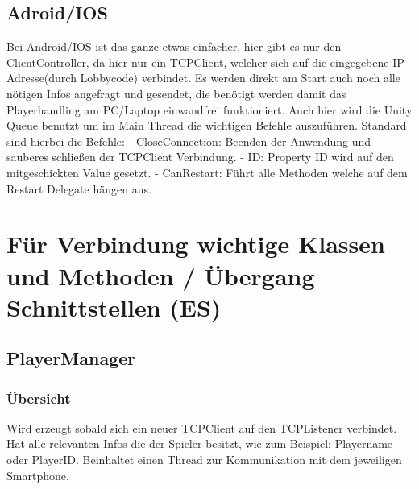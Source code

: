 \subsection{Adroid/IOS}
Bei Android/IOS ist das ganze etwas einfacher, hier gibt es nur den ClientController, da hier nur ein TCPClient, welcher sich auf die eingegebene IP-Adresse(durch Lobbycode) verbindet. Es werden direkt am Start auch noch alle nötigen Infos angefragt und gesendet, die benötigt werden damit das Playerhandling am PC/Laptop einwandfrei funktioniert. Auch hier wird die Unity Queue benutzt um im Main Thread die wichtigen Befehle auszuführen. Standard sind hierbei die Befehle:
\newline \tab
- CloseConnection: Beenden der Anwendung und sauberes schließen der \newline \tab TCPClient Verbindung.
\newline \tab
- ID: Property ID wird auf den mitgeschickten Value gesetzt.
\newline \tab 
- CanRestart: Führt alle Methoden welche auf dem Restart Delegate hängen aus.
\section{Für Verbindung wichtige Klassen und Methoden / Übergang Schnittstellen (ES)} 
\subsection{PlayerManager}
\subsubsection{Übersicht}
Wird erzeugt sobald sich ein neuer TCPClient auf den TCPListener verbindet. Hat alle relevanten Infos die der Spieler besitzt, wie zum Beispiel: Playername oder PlayerID. Beinhaltet einen Thread zur Kommunikation mit dem jeweiligen Smartphone.
